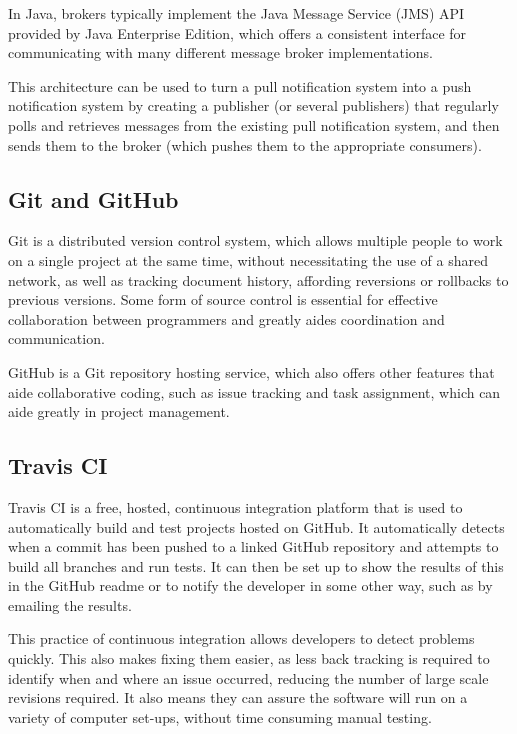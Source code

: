 \documentclass[a4paper, 12pt, twoside]{article}
\begin{document}
In Java, brokers typically implement the Java Message Service (JMS) API provided by Java Enterprise Edition\cite{hapner2002java}, which offers a consistent interface for communicating with many different message broker implementations.

This architecture can be used to turn a pull notification system into a push notification system by creating a publisher (or several publishers) that regularly polls and retrieves messages from the existing pull notification system, and then sends them to the broker (which pushes them to the appropriate consumers).

\subsection{Git and GitHub}
\label{sec:bg_git}

Git is a distributed version control system, which allows multiple people to work on a single project at the same time, without necessitating the use of a shared network, as well as tracking document history, affording reversions or rollbacks to previous versions. Some form of source control is essential for effective collaboration between programmers and greatly aides coordination and communication.

GitHub is a Git repository hosting service, which also offers other features that aide collaborative coding, such as issue tracking and task assignment, which can aide greatly in project management.

\subsection{Travis CI}
\label{sec:bg_travis}

Travis CI is a free, hosted, continuous integration platform that is used to automatically build and test projects hosted on GitHub. It automatically detects when a commit has been pushed to a linked GitHub repository and attempts to build all branches and run tests. It can then be set up to show the results of this in the GitHub readme or to notify the developer in some other way, such as by emailing the results.

This practice of continuous integration allows developers to detect problems quickly. This also makes fixing them easier, as less back tracking is required to identify when and where an issue occurred, reducing the number of large scale revisions required. It also means they can assure the software will run on a variety of computer set-ups, without time consuming manual testing\cite{fowler2006continuous}.
\end{document}
